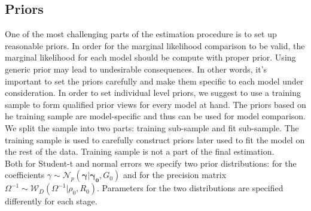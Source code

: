 \documentclass[12pt]{article}
\begin{document}
\subsection{Priors}
One of the most challenging parts of the estimation procedure is to set up reasonable priors. In order for the marginal likelihood comparison to be valid, the marginal likelihood for each model should be compute with proper prior. Using generic prior may lead to undesirable consequences. In other words, it's important to set the priors carefully and make them specific to each model under consideration. In order to set individual level priors, we suggest to use a training sample to form qualified prior views for every model at hand. The priors based on he training sample are model-specific and thus can be used for model comparison. We split  the sample into two parts: training sub-sample and fit sub-sample. The training sample is used to carefully construct priors later used to fit the model on the rest of the data. Training sample is not a part of the final estimation. \\
Both for Student-t and normal errors we specify two prior distributions: for the coefficients $\gamma \sim \mathcal{N}_{p}\left( \boldsymbol{\gamma} |\boldsymbol{\gamma_{0}},G_{0}\right)$ and for the precision matrix $\Omega^{-1} \sim \mathcal{W}_{D}  \left(\Omega ^{-1}|\rho_{0}, R_{0}\right) $. Parameters for the two distributions are specified differently for each stage.
\end{document}
